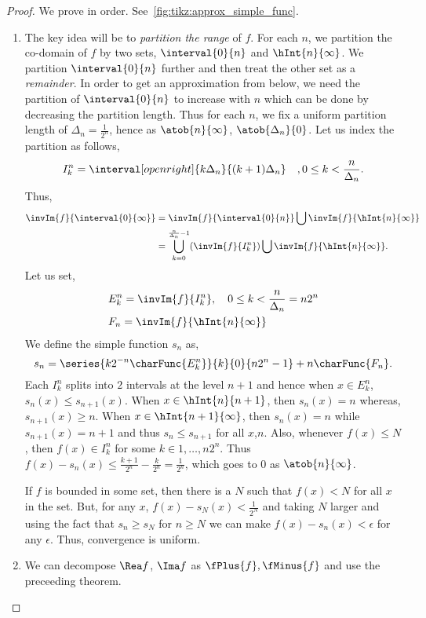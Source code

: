 \begin{proof}
    We prove in order. See~\ref{fig:tikz:approx_simple_func}. 
    \begin{enumerate}
	\item
	    The key idea will be to \emph{partition the range} of $f$. For each $n$, we partition the
	    co-domain of $f$ by two sets,
	    $\interval{0}{n}$ and $\hInt{n}{\infty}$. We partition $\interval{0}{n}$ further and then treat
	    the other set as a \emph{remainder}. In order to get an approximation from below, we need the
	    partition of $\interval{0}{n}$ to increase with $n$ which can be done by decreasing the 
	    partition length. 
	    Thus for each $n$, 
	    we fix a uniform partition length of $\Delta_n = \frac{1}{2^n}$, hence as $\atob{n}{\infty}$,
	    $\atob{\Delta_n}{0}$. Let us index the partition as follows,
	    \[I_k^n = \interval[open right]{k\Delta_n}{(k+1)\Delta_n}\quad,0\leq k < \frac{n}{\Delta_n}.\]
	    Thus,
	    \begin{align*}\invIm{f}{\interval{0}{\infty}} &= \invIm{f}{\interval{0}{n}} 
		\bigcup \invIm{f}{\hInt{n}{\infty}} \\
		& = \bigcup\limits_{k=0}^{\frac{n}{\Delta_n}-1}(\invIm{f}{I_k^n}) \bigcup 
		\invIm{f}{\hInt{n}{\infty}}. \\ 
	    \end{align*}
	    Let us set,
	    \begin{align*}
		& E_k^n = \invIm{f}{I_k^n},\quad 0\leq k < \frac{n}{\Delta_n} = n2^n\\
		& F_n = \invIm{f}{\hInt{n}{\infty}}
	    \end{align*}
	    We define the simple function $s_n$ as,
	    \[s_n = \series{k2^{-n}\charFunc{E_k^n}}{k}{0}{n2^n-1} + n\charFunc{F_n}.\]
	    Each $I_k^n$ splits into $2$ intervals at the level $n+1$ and hence when $x \in E_k^n$, $s_n(x)
	    \leq s_{n+1}(x)$. When $x \in \hInt{n}{n+1}$, then $s_n(x) = n$ whereas, $s_{n+1}(x) \geq n$. When
	    $x\in \hInt{n+1}{\infty}$, then $s_n(x) = n$ while $s_{n+1}(x) = n+1$ and thus $s_n \leq s_{n+1}$
	    for all $x$,$n$. Also, whenever $f(x) \leq N$, then $f(x) \in I_k^n$ for some $k \in
	    1,\dots,n2^n$. Thus $f(x) - s_n(x) \leq \frac{k+1}{2^n} - \frac{k}{2^n} = \frac{1}{2^n}$, which
	    goes to $0$ as $\atob{n}{\infty}$. 

	    If $f$ is bounded in some set, then there is a $N$ such that $f(x) < N$ for
	    all $x$ in the set. 
	    But, for any $x$, $f(x) - s_N(x) < \frac{1}{2^N}$ and taking $N$ larger and using the
	    fact that $s_n \geq s_N$ for $n\geq N$ we can make $f(x) - s_n(x) < \epsilon$ for any $\epsilon$.
	    Thus, convergence is uniform.
	\item
	    We can decompose $\Rea f$, $\Ima f$ as $\fPlus{f},\fMinus{f}$ and use the preceeding theorem.
    \end{enumerate}
\end{proof}

